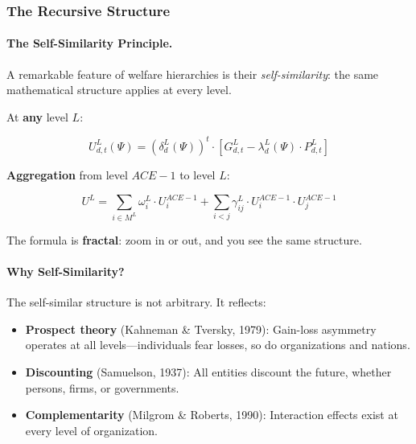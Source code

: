\subsubsection{The Recursive Structure}

\paragraph{The Self-Similarity Principle.}
A remarkable feature of welfare hierarchies is their \textit{self-similarity}: 
the same mathematical structure applies at every level.

\begin{tcolorbox}[colback=yellow!5!white, colframe=yellow!50!black, title=The Recursive Welfare Formula]
At \textbf{any} level $L$:

\begin{equation}
\boxed{
U^L_{d,t}(\Psi) = \left(\delta^L_d(\Psi)\right)^t \cdot \left[ G^L_{d,t} - \lambda^L_d(\Psi) \cdot P^L_{d,t} \right]
}
\end{equation}

\textbf{Aggregation} from level $ACE-1$ to level $L$:

\begin{equation}
\boxed{
U^L = \sum_{i \in M^L} \omega^L_i \cdot U^{ACE-1}_i + \sum_{i < j} \gamma^L_{ij} \cdot U^{ACE-1}_i \cdot U^{ACE-1}_j
}
\end{equation}

The formula is \textbf{fractal}: zoom in or out, and you see the same structure.
\end{tcolorbox}

\paragraph{Why Self-Similarity?}
The self-similar structure is not arbitrary. It reflects:
\begin{itemize}
\item \textbf{Prospect theory} (Kahneman \& Tversky, 1979): Gain-loss asymmetry 
operates at all levels---individuals fear losses, so do organizations and nations.
\item \textbf{Discounting} (Samuelson, 1937): All entities discount the future, 
whether persons, firms, or governments.
\item \textbf{Complementarity} (Milgrom \& Roberts, 1990): Interaction effects 
exist at every level of organization.
\end{itemize}

